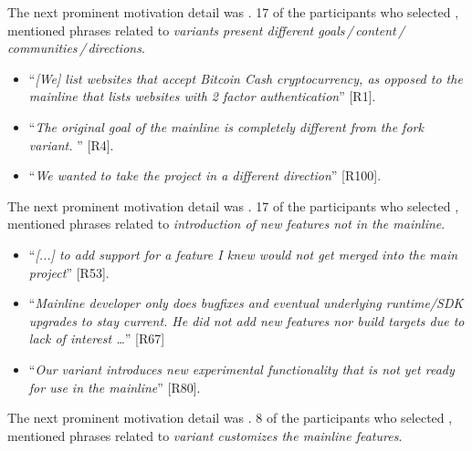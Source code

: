 \nd The next prominent  motivation detail was . 17 of the participants who selected , mentioned phrases related to \emph{variants present different goals\,/\,content\,/\,communities\,/\,directions}.

\begin{itemize}[leftmargin=*]
\item ``\emph{[We] %
list websites that accept Bitcoin Cash cryptocurrency, as opposed to the mainline that lists websites with 2 factor authentication}'' [R1].
\item ``\emph{The original goal of the mainline is completely different from the fork variant. %
}'' [R4].
\item  ``\emph{We wanted to take the project in a different direction}'' [R100].
\end{itemize}

\nd The next prominent  motivation detail was .
17 of the participants who selected , mentioned phrases related to \emph{introduction of new features not in the mainline}.

\begin{itemize}[leftmargin=*]
\item ``\emph{[...] to add support for a feature I knew would not get merged into the main project}'' [R53].
\item ``\emph{Mainline developer only does bugfixes and eventual underlying runtime/SDK upgrades to stay current. He did not add new features nor build targets due to lack of interest \ldots}'' [R67]
\item ``\emph{Our variant introduces new experimental functionality that is not yet ready for use in the mainline}'' [R80].
\end{itemize}

\nd The next prominent  motivation detail was .
8 of the participants who selected , mentioned phrases related to \emph{variant customizes the mainline features}.

